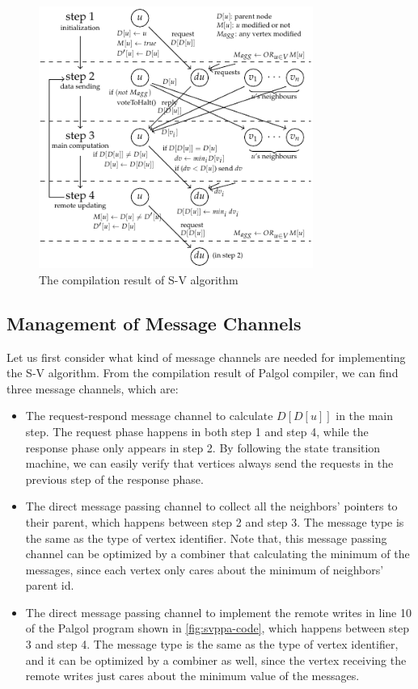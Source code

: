 \documentclass{sokendai_thesis} %
\begin{document}
\begin{figure}[th]
 \centering
 \includegraphics[width=0.8\textwidth]{figures/svppa.pdf}
 \caption{The compilation result of S-V algorithm}
 \label{fig:full}
\end{figure}

\subsection{Management of Message Channels}

Let us first consider what kind of message channels are needed for implementing the S-V algorithm.
From the compilation result of Palgol compiler, we can find three message channels, which are:
\begin{itemize}
\item
 The request-respond message channel to calculate $D[D[u]]$ in the main step.
 The request phase happens in both step 1 and step 4, while the response phase only appears in step 2.
 By following the state transition machine, we can easily verify that vertices always send the requests in the previous step of the response phase.
\item
 The direct message passing channel to collect all the neighbors' pointers to their parent, which happens between step 2 and step 3.
 The message type is the same as the type of vertex identifier.
 Note that, this message passing channel can be optimized by a combiner that calculating the minimum of the messages, since each vertex only cares about the minimum of neighbors' parent id.
\item
 The direct message passing channel to implement the remote writes in line 10 of the Palgol program shown in \autoref{fig:svppa-code}, which happens between step 3 and step 4.
 The message type is the same as the type of vertex identifier, and it can be optimized by a combiner as well, since the vertex receiving the remote writes just cares about the minimum value of the messages.
\end{itemize}
\end{document}
